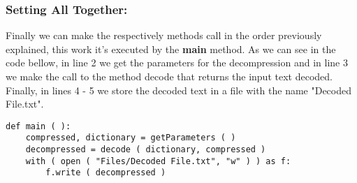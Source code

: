\subsubsection{Setting All Together:}

Finally we can make the respectively methods call in the order previously explained, this work it's executed by the {\bfseries main} method. As we can see in the code bellow, in line 2 we get the parameters for the decompression and in line 3 we make the call to the method decode that returns the input text decoded. Finally, in lines 4 - 5 we store the decoded text in a file with the name "Decoded File.txt". \hfill \break

\begin{lstlisting}
def main ( ):
    compressed, dictionary = getParameters ( )
    decompressed = decode ( dictionary, compressed )
    with ( open ( "Files/Decoded File.txt", "w" ) ) as f:
        f.write ( decompressed )
\end{lstlisting}
